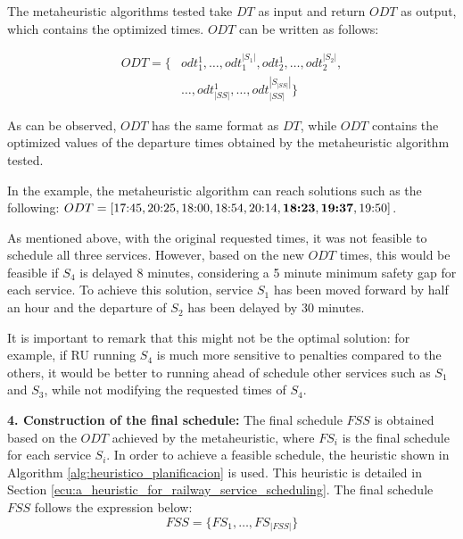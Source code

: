 \documentclass[Afour,sagev,times]{sagej}
\begin{document}
The metaheuristic algorithms tested take $DT$ as input and return $ODT$ as output, which contains the optimized times. $ ODT $ can be written as follows:
    
\begin{equation}\label{ecu:opt_departure_times}
\begin{aligned}
    ODT = \{ & odt_1^1, \dots, odt_1^{|S_1|}, odt_2^1, \dots, odt_2^{|S_2|}, \\
             & \dots, odt_{|SS|}^1, \dots, odt_{|SS|}^{|S_{|SS|}|} \}
\end{aligned}
\end{equation}
    
    As can be observed, $ODT$ has the same format as $DT$, while $ ODT $ contains the optimized values of the departure times obtained by the metaheuristic algorithm tested.

    In the example, the metaheuristic algorithm can reach solutions such as the following:
    $ODT = [\text{17:45}, \text{20:25}, \text{18:00}, \text{18:54}, \text{20:14},  \text{\textbf{18:23}},  \text{\textbf{19:37}}, \text{19:50}]$.
    
    As mentioned above, with the original requested times, it was not feasible to schedule all three services. However, based on the new $ODT$ times, this would be feasible if $S_4$ is delayed 8 minutes, considering a 5 minute minimum safety gap for each service. To achieve this solution, service $S_1$ has been moved forward by half an hour and the departure of $S_2$ has been delayed by 30 minutes.       

    It is important to remark that this might not be the optimal solution: for example, if \gls{RU} running $S_4$ is much more sensitive to penalties compared to the others, it would be better to running ahead of schedule other services such as $S_1$ and $S_3$, while not modifying the requested times of $S_4$.
    
\noindent  \textbf{4. Construction of the final schedule:} The final schedule $FSS$ is obtained based on the $ODT$ achieved by the metaheuristic, where $FS_i$ is the final schedule for each service $S_i$. In order to achieve a feasible schedule, the heuristic shown in Algorithm \ref{alg:heuristico_planificacion} is used. This heuristic is detailed in Section \ref{ecu:a_heuristic_for_railway_service_scheduling}. The final schedule $FSS$ follows the expression below:
    \begin{equation}\label{ecu:final_set_of_schedule}
        FSS = \{ FS_1, \dots, FS_{|FSS|} \}
    \end{equation}
    
\end{document}
